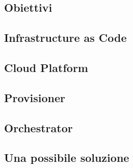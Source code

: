 \subsection{Obiettivi}
\subsection{Infrastructure as Code}
\subsection{Cloud Platform}
\subsection{Provisioner}
\subsection{Orchestrator}
\subsection{Una possibile soluzione}